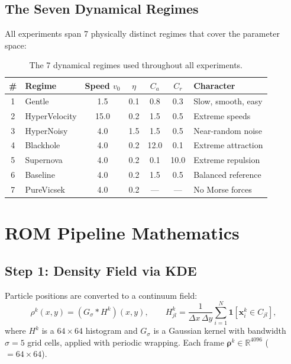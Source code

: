 \documentclass[11pt]{article}
\newcommand{\R}{\mathbb{R}}
\newcommand{\bx}{\mathbf{x}}
\newcommand{\brho}{\boldsymbol{\rho}}
\newcommand{\regime}[1]{\textsf{#1}}
\begin{document}
\subsection{The Seven Dynamical Regimes}

All experiments span 7 physically distinct regimes that cover the
parameter space:

\begin{table}[H]
\centering
\caption{The 7 dynamical regimes used throughout all experiments.}
\label{tab:regimes}
\small
\begin{tabular}{@{}clccccl@{}}
\toprule
\# & Regime & Speed $v_0$ & $\eta$ & $C_a$ & $C_r$ & Character \\
\midrule
1 & \regime{Gentle}       & 1.5  & 0.1 & 0.8  & 0.3  & Slow, smooth, easy \\
2 & \regime{HyperVelocity}& 15.0 & 0.2 & 1.5  & 0.5  & Extreme speeds \\
3 & \regime{HyperNoisy}   & 4.0  & 1.5 & 1.5  & 0.5  & Near-random noise \\
4 & \regime{Blackhole}    & 4.0  & 0.2 & 12.0 & 0.1  & Extreme attraction \\
5 & \regime{Supernova}    & 4.0  & 0.2 & 0.1  & 10.0 & Extreme repulsion \\
6 & \regime{Baseline}     & 4.0  & 0.2 & 1.5  & 0.5  & Balanced reference \\
7 & \regime{PureVicsek}   & 4.0  & 0.2 & ---  & ---  & No Morse forces \\
\bottomrule
\end{tabular}
\end{table}


\section{ROM Pipeline Mathematics}
\label{sec:rom_math}

\subsection{Step 1: Density Field via KDE}

Particle positions are converted to a continuum field:
\begin{equation}
  \rho^k(x,y) = (G_\sigma * H^k)(x,y),
  \qquad
  H^k_{jl} = \frac{1}{\Delta x\,\Delta y}
  \sum_{i=1}^N \mathbf{1}[\bx_i^k \in C_{jl}],
\end{equation}
where $H^k$ is a $64 \times 64$ histogram and $G_\sigma$ is a Gaussian
kernel with bandwidth $\sigma = 5$ grid cells, applied with periodic
wrapping.  Each frame $\brho^k \in \R^{4096}$ ($= 64 \times 64$).
\end{document}
